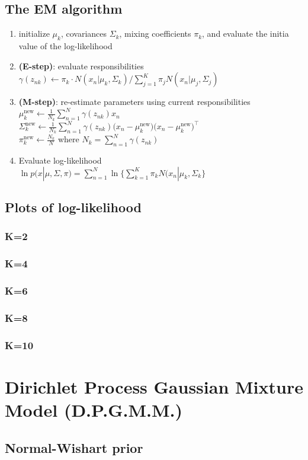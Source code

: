 \documentclass{article}
\begin{document}
\subsection{The EM algorithm}
\begin{enumerate}
	\item initialize $\mu_k$, covariances $\Sigma_k$, mixing coefficients $\pi_k$, and evaluate the initia value of the log-likelihood
	\item \textbf{(E-step)}: evaluate responsibilities\\
$\gamma(z_{nk}) \leftarrow \pi_k \cdot N(x_n | \mu_k, \Sigma_k) / \displaystyle \sum_{j=1}^K \pi_j N(x_n | \mu_j, \Sigma_j)$ \\
		\item \textbf{(M-step)}: re-estimate parameters using current responsibilities\\
	$\mu_k^{\text{new}} \leftarrow \frac{1}{N_k} \displaystyle \sum_{n=1}^N \gamma(z_{nk}) x_n$ \\
$\Sigma_k^{\text{new}} \leftarrow \frac{1}{N_k} \displaystyle \sum_{n=1}^N \gamma(z_{nk}) \Big(x_n - \mu_k^\text{new}\Big)\Big(x_n - \mu_k^\text{new}\Big)^\top$ \\
$ \pi_k^\text{new} \leftarrow \frac{N_k}{N}$ where $N_k = \displaystyle \sum_{n=1}^N \gamma(z_{nk})$

\item Evaluate log-likelihood \\
$\ln p(x | \mu, \Sigma, \pi) = \displaystyle \sum_{n=1}^N  \ln \Big\{ \sum_{k=1}^K \pi_k N(x_n | \mu_k, \Sigma_k \Big\} $

\end{enumerate}

\subsection{Plots of log-likelihood}
\subsubsection{K=2}
\subsubsection{K=4}
\subsubsection{K=6}
\subsubsection{K=8}
\subsubsection{K=10}


\section{Dirichlet Process Gaussian Mixture Model (D.P.G.M.M.)}
\subsection{Normal-Wishart prior}
\end{document}
